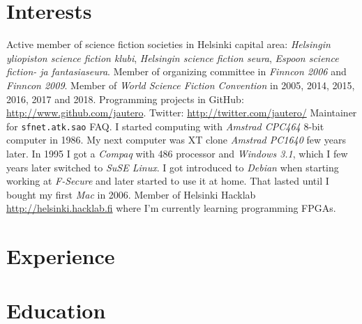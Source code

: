 \documentclass[a4paper]{twentysecondcv}
\begin{document}
\aboutme{}

\skills{}


\skillstext{}


\makeprofile %

\section{Interests}

Active member of science fiction societies in Helsinki capital area:
\emph{Helsingin yliopiston science fiction klubi},
\emph{Helsingin science fiction seura},
\emph{Espoon science fiction- ja fantasiaseura}. Member of organizing committee
in \emph{Finncon 2006} and \emph{Finncon 2009}. Member of
\emph{World Science Fiction Convention} in 2005, 2014, 2015, 2016, 2017 and 2018.
Programming projects in GitHub: \url{http://www.github.com/jautero}.
Twitter: \url{http://twitter.com/jautero/} Maintainer for \texttt{sfnet.atk.sao}
FAQ. I started computing with \emph{Amstrad CPC464} 8-bit computer in 1986.
My next computer was XT clone \emph{Amstrad PC1640} few years later. In 1995 I
got a \emph{Compaq} with 486 processor and \emph{Windows 3.1}, which I few years
later switched to \emph{SuSE Linux}. I got introduced to \emph{Debian} when
starting working at \emph{F-Secure} and later started to use it at home. That
lasted until I bought my first \emph{Mac} in 2006. Member of Helsinki Hacklab
\url{http://helsinki.hacklab.fi} where I'm currently learning programming FPGAs.


\section{Experience}

\begin{twenty} %
\end{twenty}

\section{Education}

\begin{twenty} %
\end{twenty}
\end{document}
